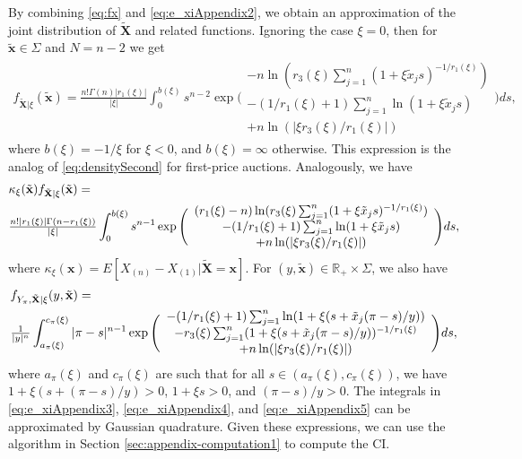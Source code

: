 By combining \eqref{eq:fx} and \eqref{eq:e_xiAppendix2}, we obtain an approximation of the joint distribution of $\tilde{\mathbf{X}}$ and related functions. Ignoring the case $\xi =0$, then for $\mathbf{\tilde{x}}\in \Sigma $ and $N=n-2$ we get
\begin{align}
    f_{\tilde{\mathbf{X}}|\xi }(\tilde{\mathbf{x}})=\tfrac{n!\Gamma (n)|r_{1}( \xi ) |}{|\xi |}\int_{0}^{b(\xi )}s^{n-2}\exp \bigg(
\begin{array}{c}
-n\ln (r_{3}( \xi ) \sum_{j=1}^{n}(1+\xi \tilde{x} _{j}s)^{-1/r_{1}( \xi ) }) \\
-( 1/r_{1}( \xi ) +1) \sum_{j=1}^{n}\ln (1+\xi \tilde{x }_{j}s)\\
+n\ln (|\xi r_{3}( \xi ) /r_{1}( \xi ) |)
\end{array}
\bigg) ds,
\label{eq:e_xiAppendix3}
\end{align}
where $b(\xi )=-1/\xi $ for $\xi <0$, and $b(\xi )=\infty $ otherwise. This expression is the analog of \eqref{eq:densitySecond} for first-price auctions. Analogously, we have
\begin{align}
    &\kappa _{\xi }(\tilde{\mathbf{x}})f_{\tilde{\mathbf{X}}|\xi }(\tilde{\mathbf{ x}})=\notag\\
    &\tfrac{n!|r_{1}( \xi ) |\Gamma (n-r_{1}( \xi ) )}{ |\xi |}\int_{0}^{b(\xi )}s^{n-1}\exp \Bigg(
\begin{array}{c}
(r_{1}( \xi ) -n)\ln (r_{3}( \xi ) \sum_{j=1}^{n}(1+\xi \tilde{x}_{j}s)^{-1/r_{1}( \xi ) }) \\
-( 1/r_{1}( \xi ) +1) \sum_{j=1}^{n}\ln (1+\xi \tilde{x }_{j}s)\\
+n\ln (|\xi r_{3}( \xi ) /r_{1}( \xi ) |)
\end{array}
\Bigg) ds,
\label{eq:e_xiAppendix4}
\end{align}
where $\kappa _{\xi }(\mathbf{x})=E[X_{( n) }-X_{( 1) }|\mathbf{\tilde{X}}=\mathbf{x}]$. For $(y,\mathbf{\tilde{x}})\in \mathbb{R} _{+}\times \Sigma $, we also have
\begin{align}
    &f_{Y_{\pi },\tilde{\mathbf{X}}|\xi }(y,\tilde{\mathbf{x}})=\notag\\
    &\tfrac{1}{|y|^{n}}\int_{a_{ \pi }(\xi )}^{c_{\pi }(\xi )}|\pi -s|^{n-1}\exp \Bigg(
\begin{array}{c}
-( 1/r_{1}( \xi ) +1) \sum_{j=1}^{n}\ln (1+\xi (s+ \tilde{x}_{j}(\pi -s)/y)) \\
-r_{3}( \xi ) \sum_{j=1}^{n}(1+\xi (s+\tilde{x}_{j}(\pi -s)/y))^{-1/r_{1}( \xi ) }\\
+n\ln (|\xi r_{3}( \xi ) /r_{1}( \xi ) |)
\end{array}
\Bigg) ds,
\label{eq:e_xiAppendix5}
\end{align}
where $a_{\pi }(\xi )$ and $c_{\pi }(\xi )$ are such that for all $s\in (a_{\pi }(\xi ),c_{\pi }(\xi ))$, we have $1+\xi (s+(\pi -s)/y)>0$, $1+\xi s>0$, and $(\pi -s)/y>0$. The integrals in \eqref{eq:e_xiAppendix3}, \eqref{eq:e_xiAppendix4}, and \eqref{eq:e_xiAppendix5} can be approximated by Gaussian quadrature. Given these expressions, we can use the algorithm in Section \ref{sec:appendix-computation1} to compute the CI.

